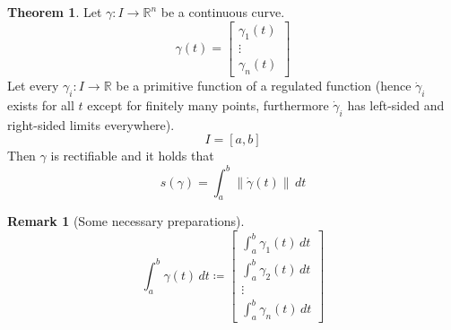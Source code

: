 \documentclass[a4paper,landscape,twocolumn]{article}
\theoremstyle{definition}
\newtheorem{theorem}{Theorem}
\newtheorem{rem}{Remark}
\newcommand\norm[1]{\left\|#1\right\|}
\begin{document}
\begin{theorem}
  Let $\gamma: I \to \mathbb R^n$ be a continuous curve.
  \[
    \gamma(t) = \begin{bmatrix}
      \gamma_1(t) \\
      \vdots \\
      \gamma_n(t)
    \end{bmatrix}
  \]
  Let every $\gamma_i: I \to \mathbb R$ be a primitive function of a regulated function
  (hence $\dot{\gamma}_i$ exists for all $t$ except for finitely many points,
  furthermore $\dot{\gamma}_i$ has left-sided and right-sided limits everywhere).
  \[ I = [a,b] \]
  Then $\gamma$ is rectifiable and it holds that
  \[ s(\gamma) = \int_a^b \norm{\dot{\gamma}(t)} \, dt \]
\end{theorem}

\begin{rem}[Some necessary preparations]
  \[
    \int_a^b \gamma(t) \, dt \coloneqq
    \begin{bmatrix}
      \int_a^b \gamma_1(t) \, dt \\
      \int_a^b \gamma_2(t) \, dt \\
      \vdots \\
      \int_a^b \gamma_n(t) \, dt
    \end{bmatrix}
  \]
\end{rem}
\end{document}

